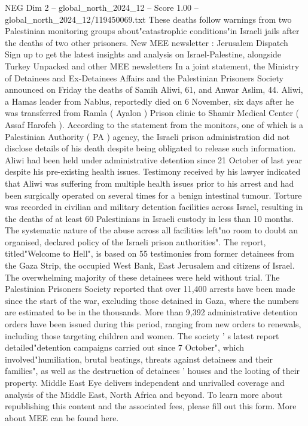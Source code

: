 \begin{textsample}{NEG Dim 2 – global\_north\_2024\_12 – Score 1.00 – global\_north\_2024\_12/119450069.txt}  \label{ex:f2_neg_173}
These deaths follow warnings from two Palestinian monitoring groups about"catastrophic conditions"in Israeli jails after the deaths of two other prisoners.
New MEE newsletter : Jerusalem Dispatch Sign up to get the latest insights and analysis on Israel-Palestine, alongside Turkey Unpacked and other MEE newsletters In a joint statement, the Ministry of Detainees and Ex-Detainees Affairs and the Palestinian Prisoners Society announced on Friday the deaths of Samih Aliwi, 61, and Anwar Aslim, 44.
Aliwi, a Hamas leader from Nablus, reportedly died on 6 November, six days after he was transferred from Ramla ( Ayalon ) Prison clinic to Shamir Medical Center ( Assaf Harofeh ).
According to the statement from the monitors, one of which is a Palestinian Authority ( PA ) agency, the Israeli prison administration did not disclose details of his death despite being obligated to release such information.
Aliwi had been held under administrative detention since 21 October of last year despite his pre-existing health issues.
Testimony received by his lawyer indicated that Aliwi was suffering from multiple health issues prior to his arrest and had been surgically operated on several times for a benign intestinal tumour.
Torture was recorded in civilian and military detention facilities across Israel, resulting in the deaths of at least 60 Palestinians in Israeli custody in less than 10 months.
The systematic nature of the abuse across all facilities left"no room to doubt an organised, declared policy of the Israeli prison authorities".
The report, titled"Welcome to Hell", is based on 55 testimonies from former detainees from the Gaza Strip, the occupied West Bank, East Jerusalem and citizens of Israel.
The overwhelming majority of these detainees were held without trial.
The Palestinian Prisoners Society reported that over 11,400 arrests have been made since the start of the war, excluding those detained in Gaza, where the numbers are estimated to be in the thousands.
More than 9,392 administrative detention orders have been issued during this period, ranging from new orders to renewals, including those targeting children and women.
The society ' s latest report detailed"detention campaigns carried out since 7 October", which involved"humiliation, brutal beatings, threats against detainees and their families", as well as the destruction of detainees ' houses and the looting of their property.
Middle East Eye delivers independent and unrivalled coverage and analysis of the Middle East, North Africa and beyond.
To learn more about republishing this content and the associated fees, please fill out this form.
More about MEE can be found here.

\end{textsample}
